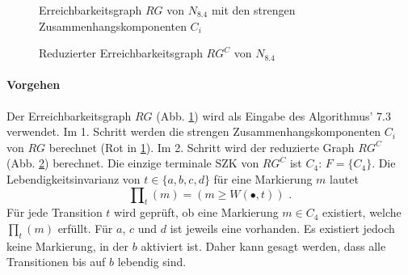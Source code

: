 \documentclass[a4paper]{scrartcl}
\begin{document}
\begin{figure}[h]
\begin{tikzpicture}[
        auto,
        scale=2,
    ]
    \end{tikzpicture}
    \caption{Erreichbarkeitsgraph $RG$ von $N_{8.4}$ mit den strengen
        Zusammenhangskomponenten $C_i$}
    \label{fig:reachability}
\end{figure}

\begin{figure}[h]
    \centering
    \caption{Reduzierter Erreichbarkeitsgraph $RG^C$ von $N_{8.4}$}
    \label{fig:rgc}
\end{figure}

\paragraph{Vorgehen}
Der Erreichbarkeitsgraph $RG$ (Abb. \ref{fig:reachability}) wird als Eingabe
des Algorithmus' 7.3 verwendet.
Im 1. Schritt werden die strengen Zusammenhangskomponenten $C_i$ von $RG$
berechnet (Rot in \ref{fig:reachability}).
Im 2. Schritt wird der reduzierte Graph $RG^C$ (Abb. \ref{fig:rgc}) berechnet.
Die einzige terminale SZK von $RG^C$ ist $C_4$: $F = \{ C_4 \}$.
Die Lebendigkeitsinvarianz von $t \in \{ a,b,c,d \}$ für eine Markierung $m$
lautet
\begin{equation}
    \prod\nolimits_t (m) = (m \geq W(\bullet,t)) \text{ .}
\end{equation}
Für jede Transition $t$ wird geprüft, ob eine Markierung $m \in C_4$ existiert,
welche $\prod\nolimits_t(m)$ erfüllt.
Für $a$, $c$ und $d$ ist jeweils eine vorhanden.
Es existiert jedoch keine Markierung, in der $b$ aktiviert ist.
Daher kann gesagt werden, dass alle Transitionen bis auf $b$ lebendig sind.
\end{document}
